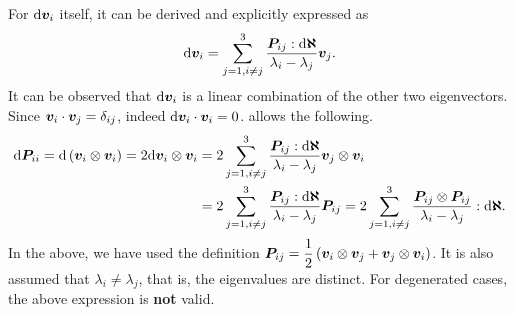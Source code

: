 For $\mathrm{d}\bm{v}_i$ itself, it can be derived and explicitly expressed as
\begin{gather}\label{eq:eigenvector_diff_def}
    \mathrm{d}\bm{v}_i=\sum_{j=1,i\neq{}j}^3\dfrac{\bm{P}_{ij}:\mathrm{d}\bm{\aleph}}{\lambda_i-\lambda_j}\bm{v}_j.
\end{gather}
It can be observed that $ \mathrm{d}\bm{v}_i$ is a linear combination of the other two eigenvectors.
Since $\bm{v}_i\cdot\bm{v}_j=\delta_{ij}$, indeed $\mathrm{d}\bm{v}_i\cdot\bm{v}_i=0$.
 allows the following.
\begin{gather}
    \begin{split}
        \mathrm{d}\bm{P}_{ii}=\mathrm{d}\left(\bm{v}_i\otimes\bm{v}_i\right)=2\mathrm{d}\bm{v}_i\otimes\bm{v}_i & =2\sum_{j=1,i\neq{}j}^3\dfrac{\bm{P}_{ij}:\mathrm{d}\bm{\aleph}}{\lambda_i-\lambda_j}\bm{v}_j\otimes\bm{v}_i \\&=2\sum_{j=1,i\neq{}j}^3\dfrac{\bm{P}_{ij}:\mathrm{d}\bm{\aleph}}{\lambda_i-\lambda_j}\bm{P}_{ij}=2\sum_{j=1,i\neq{}j}^3\dfrac{\bm{P}_{ij}\otimes\bm{P}_{ij}}{\lambda_i-\lambda_j}:\mathrm{d}\bm{\aleph}.
    \end{split}
\end{gather}
In the above, we have used the definition $\bm{P}_{ij}=\dfrac{1}{2}\left(\bm{v}_i\otimes\bm{v}_j+\bm{v}_j\otimes\bm{v}_i\right)$.
It is also assumed that $\lambda_i\neq\lambda_j$, that is, the eigenvalues are distinct.
For degenerated cases, the above expression is \textbf{not} valid.

